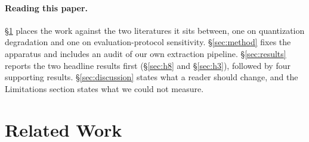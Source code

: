 \documentclass[11pt]{article}
\begin{document}

\paragraph{Reading this paper.}
\S\ref{sec:related} places the work against the two literatures it sits between,
one on quantization degradation and one on evaluation-protocol sensitivity.
\S\ref{sec:method} fixes the apparatus and includes an audit of our own
extraction pipeline. \S\ref{sec:results} reports the two headline results first
(\S\ref{sec:h8} and \S\ref{sec:h3}), followed by four supporting results. \S\ref{sec:discussion} states what a reader should change, and
the Limitations section states what we could not measure.

\section{Related Work}
\label{sec:related}
%
\end{document}
